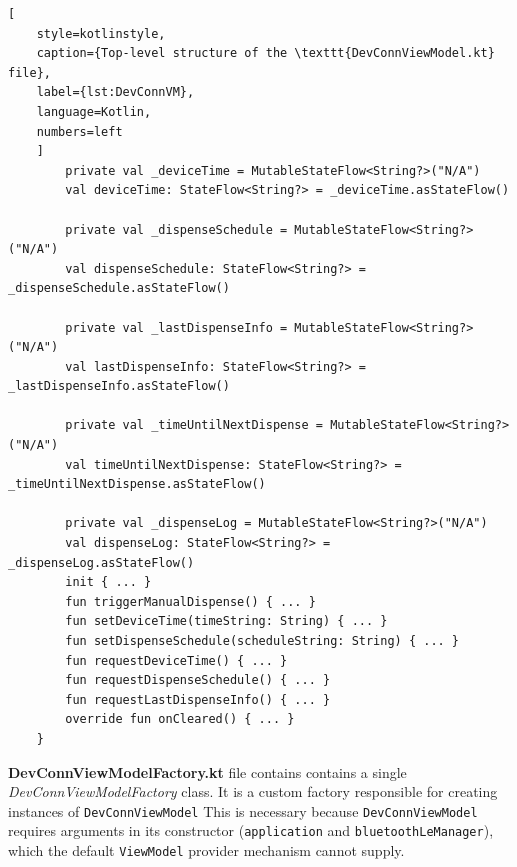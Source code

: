 \begin{lstlisting}[
	style=kotlinstyle,
	caption={Top-level structure of the \texttt{DevConnViewModel.kt} file},
	label={lst:DevConnVM},
	language=Kotlin,
	numbers=left
	]
		private val _deviceTime = MutableStateFlow<String?>("N/A")
		val deviceTime: StateFlow<String?> = _deviceTime.asStateFlow()
		
		private val _dispenseSchedule = MutableStateFlow<String?>("N/A")
		val dispenseSchedule: StateFlow<String?> = _dispenseSchedule.asStateFlow()
		
		private val _lastDispenseInfo = MutableStateFlow<String?>("N/A")
		val lastDispenseInfo: StateFlow<String?> = _lastDispenseInfo.asStateFlow()
		
		private val _timeUntilNextDispense = MutableStateFlow<String?>("N/A")
		val timeUntilNextDispense: StateFlow<String?> = _timeUntilNextDispense.asStateFlow()
		
		private val _dispenseLog = MutableStateFlow<String?>("N/A")
		val dispenseLog: StateFlow<String?> = _dispenseLog.asStateFlow()
		init { ... }
		fun triggerManualDispense() { ... }
		fun setDeviceTime(timeString: String) { ... }
		fun setDispenseSchedule(scheduleString: String) { ... }
		fun requestDeviceTime() { ... }
		fun requestDispenseSchedule() { ... }
		fun requestLastDispenseInfo() { ... }
		override fun onCleared() { ... }
	}
\end{lstlisting}

\textbf{DevConnViewModelFactory.kt} file contains contains a single \textit{DevConnViewModelFactory} class. It is a custom factory responsible for creating instances of \texttt{DevConnViewModel} This is necessary because \texttt{DevConnViewModel} requires arguments in its constructor (\texttt{application} and \texttt{bluetoothLeManager}), which the default \texttt{ViewModel} provider mechanism cannot supply.
\newpage
